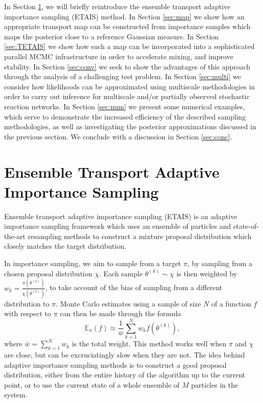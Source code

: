\documentclass[final]{siamltex}
\begin{document}

In Section \ref{sec:ETAIS}, we will briefly reintroduce the ensemble
transport adaptive importance sampling (ETAIS) method. In Section \ref{sec:map} we show how an appropriate transport map can
be constructed from importance samples which maps the posterior close
to a reference Gaussian measure. In Section \ref{sec:TETAIS} we show
how such a map can be incorporated into a sophisticated parallel MCMC
infrastructure in order to accelerate mixing, and improve stability. In Section
\ref{sec:conv} we seek to show the advantages of this approach through
the analysis of a challenging test problem. In Section
\ref{sec:multi} we consider how likelihoods can be approximated using
 multiscale methodologies in order to carry out inference for
multiscale and/or partially observed stochastic reaction networks. In
Section \ref{sec:num} we present some numerical examples, which serve
to demonstrate the increased efficiency of the described sampling
methodologies, as well as investigating the posterior approximations
discussed in the previous section. We conclude with a discussion in
Section \ref{sec:conc}.

\section{Ensemble Transport Adaptive Importance Sampling}\label{sec:ETAIS}
Ensemble transport adaptive importance sampling
(ETAIS)\cite{cotter2015parallel} is an adaptive importance sampling framework
which uses an ensemble of particles and state-of-the-art resampling
methods to construct a mixture proposal distribution which closely
matches the target distribution. 

In importance sampling, we aim to sample from a target $\pi$, by
sampling from a chosen proposal distribution $\chi$. Each sample $\theta^{(k)} \sim \chi$ is then weighted by
$w_k = \frac{\pi(\theta^{(k)})}{\chi(\theta^{(k)})}$, to take account of the bias of
sampling from a different distribution to $\pi$. Monte Carlo estimates
using a sample of size $N$
of a function $f$ with respect to $\pi$ can then be made through the
formula
\[\mathbb{E}_\pi(f) \approx \frac{1}{\bar{w}} \sum_{k=1}^N
  w_kf(\theta^{(k)}),\]
where $\bar{w} = \sum_{k=1}^N w_k$ is the total weight.
This method works well when $\pi$ and $\chi$ are close, but can be
excruciatingly slow when they are not. The idea behind adaptive
importance sampling methods is
to construct a good proposal distribution, either from the entire
history of the algorithm up to the current point, or to use the
current state of a whole ensemble of $M$ particles in the system.
\end{document}
